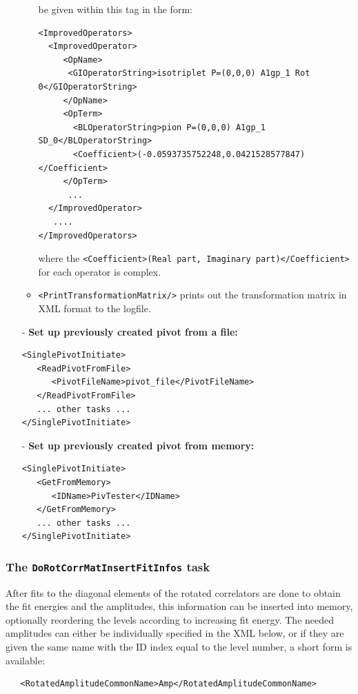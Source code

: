 \documentclass[12pt]{article}
\newcommand{\vb}{\texttt}
\begin{document}
\begin{itemize}
\begin{itemize}
be given within this tag in the form:
\begin{footnotesize}
\begin{verbatim}
<ImprovedOperators>
  <ImprovedOperator>
     <OpName>
      <GIOperatorString>isotriplet P=(0,0,0) A1gp_1 Rot 0</GIOperatorString>
     </OpName>
     <OpTerm>
       <BLOperatorString>pion P=(0,0,0) A1gp_1 SD_0</BLOperatorString>
       <Coefficient>(-0.0593735752248,0.0421528577847)</Coefficient>
     </OpTerm>
      ...
  </ImprovedOperator>
   ....
</ImprovedOperators>
\end{verbatim}
\end{footnotesize}
where the \vb{<Coefficient>(Real part, Imaginary part)</Coefficient>} for each operator is complex.
\item \vb{<PrintTransformationMatrix/>} prints out the transformation matrix in XML format to the logfile.
\end{itemize}

\item[-] \textbf{Set up previously created pivot from a file:}
\begin{verbatim}
<SinglePivotInitiate>
   <ReadPivotFromFile>
      <PivotFileName>pivot_file</PivotFileName>
   </ReadPivotFromFile>
   ... other tasks ...
</SinglePivotInitiate>
\end{verbatim}

\item[-] \textbf{Set up previously created pivot from memory:}
\begin{verbatim}
<SinglePivotInitiate>
   <GetFromMemory>
      <IDName>PivTester</IDName>
   </GetFromMemory>
   ... other tasks ...
</SinglePivotInitiate>
\end{verbatim}
\end{itemize}

\subsubsection{The \vb{DoRotCorrMatInsertFitInfos} task}
After fits to the diagonal elements of the rotated correlators are done
to obtain the fit energies and the amplitudes, this information can be
inserted into memory, optionally reordering the levels according to
increasing fit energy. The needed amplitudes can either be individually
specified in the XML below, or if they are given the same name with the ID
index equal to the level number, a short form is available:
\begin{verbatim}
   <RotatedAmplitudeCommonName>Amp</RotatedAmplitudeCommonName>
\end{verbatim}
\end{document}
